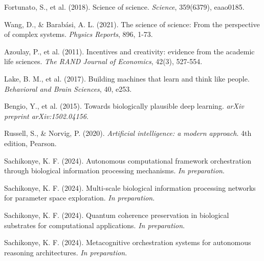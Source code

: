 \documentclass[12pt,a4paper]{article}
\begin{document}
\begin{thebibliography}{20}
Fortunato, S., et al. (2018). Science of science. \textit{Science}, 359(6379), eaao0185.

Wang, D., \& Barabási, A. L. (2021). The science of science: From the perspective of complex systems. \textit{Physics Reports}, 896, 1-73.

Azoulay, P., et al. (2011). Incentives and creativity: evidence from the academic life sciences. \textit{The RAND Journal of Economics}, 42(3), 527-554.

Lake, B. M., et al. (2017). Building machines that learn and think like people. \textit{Behavioral and Brain Sciences}, 40, e253.

Bengio, Y., et al. (2015). Towards biologically plausible deep learning. \textit{arXiv preprint arXiv:1502.04156}.

Russell, S., \& Norvig, P. (2020). \textit{Artificial intelligence: a modern approach}. 4th edition, Pearson.

Sachikonye, K. F. (2024). Autonomous computational framework orchestration through biological information processing mechanisms. \textit{In preparation}.

Sachikonye, K. F. (2024). Multi-scale biological information processing networks for parameter space exploration. \textit{In preparation}.

Sachikonye, K. F. (2024). Quantum coherence preservation in biological substrates for computational applications. \textit{In preparation}.

Sachikonye, K. F. (2024). Metacognitive orchestration systems for autonomous reasoning architectures. \textit{In preparation}.

\end{thebibliography}
\end{document}
